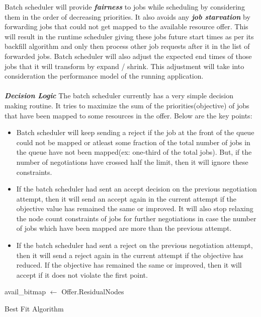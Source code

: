 Batch scheduler will provide \textbf{\textit{fairness}} to jobs while scheduling by considering them in the order of decreasing priorities. It also avoids any \textbf{\textit{job starvation}} by forwarding jobs that could not get mapped to the available resource offer. This will result in the runtime scheduler giving these jobs future start times as per its backfill algorithm and only then process other job requests after it  in the list of forwarded jobs. Batch scheduler will also adjust the expected end times of those jobs that it will transform by expand / shrink. This adjustment will take into consideration the performance model of the running application.\\ \\
\textbf{\textit{Decision Logic}} The batch scheduler currently has a very simple decision making routine. It tries to maximize the sum of the priorities(objective) of jobs that have been mapped to some resources in the offer. Below are the key points:
\begin{itemize}
\item Batch scheduler will keep sending a reject if the job at the front of the queue could not be mapped or atleast some fraction of the total number of jobs in the queue have not been mapped(ex: one-third of the total jobs). But, if the number of negotiations have crossed half the limit, then it will ignore these constraints.
\item If the batch scheduler had sent an accept decision on the previous negotiation attempt, then it will send an accept again in the current attempt if the objective value has remained the same or improved. It will also stop relaxing the node count constraints of jobs for further negotiations in case the number of jobs which have been mapped are more than the previous attempt.
\item If the batch scheduler had sent a reject on the previous negotiation attempt, then it will send a reject again in the current attempt if the objective has reduced. If the objective has remained the same or improved, then it will accept if it does not violate the first point.
\end{itemize}
\setcounter{AlgoLine}{0}
\begin{algorithm}[!htbp]
 \DontPrintSemicolon
 avail\_bitmap $\leftarrow$ Offer.ResidualNodes\;
 \caption{Best Fit Algorithm}
 \label{algo:2}
\end{algorithm}
